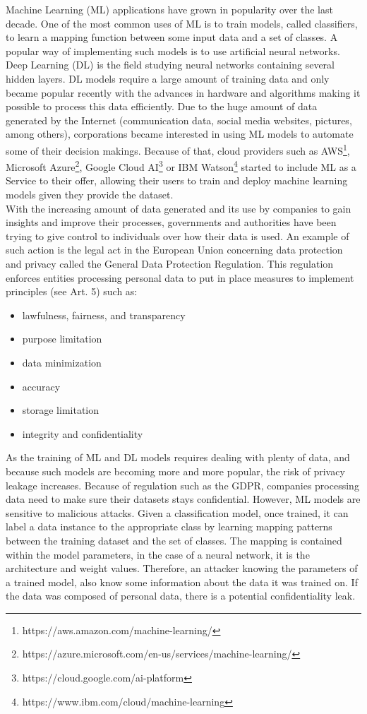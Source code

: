 \documentclass[11pt]{article}
\begin{document}
Machine Learning (ML) applications have grown in popularity over the last decade. One of the most common uses of ML is to train models, called classifiers, to learn a mapping function between some input data and a set of classes. A popular way of implementing such models is to use artificial neural networks. Deep Learning (DL) is the field studying neural networks containing several hidden layers. DL models require a large amount of training data and only became popular recently with the advances in hardware and algorithms making it possible to process this data efficiently. Due to the huge amount of data generated by the Internet (communication data, social media websites, pictures, among others), corporations became interested in using ML models to automate some of their decision makings. Because of that, cloud providers such as AWS\footnote{https://aws.amazon.com/machine-learning/}, Microsoft Azure\footnote{https://azure.microsoft.com/en-us/services/machine-learning/}, Google Cloud AI\footnote{https://cloud.google.com/ai-platform} or IBM Watson\footnote{https://www.ibm.com/cloud/machine-learning} started to include ML as a Service to their offer, allowing their users to train and deploy machine learning models given they provide the dataset.\\
With the increasing amount of data generated and its use by companies to gain insights and improve their processes, governments and authorities have been trying to give control to individuals over how their data is used. An example of such action is the legal act in the European Union concerning data protection and privacy called the General Data Protection Regulation. This regulation enforces entities processing personal data to put in place measures to implement principles (see Art. 5) such as:
\begin{itemize}
    \item lawfulness, fairness, and transparency
    \item purpose limitation
    \item data minimization
    \item accuracy
    \item storage limitation
    \item integrity and confidentiality
\end{itemize}
As the training of ML and DL models requires dealing with plenty of data, and because such models are becoming more and more popular, the risk of privacy leakage increases. Because of regulation such as the GDPR, companies processing data need to make sure their datasets stays confidential. However, ML models are sensitive to malicious attacks. Given a classification model, once trained, it can label a data instance to the appropriate class by learning mapping patterns between the training dataset and the set of classes. The mapping is contained within the model parameters, in the case of a neural network, it is the architecture and weight values. Therefore, an attacker knowing the parameters of a trained model, also know some information about the data it was trained on. If the data was composed of personal data, there is a potential confidentiality leak.\\
\end{document}
